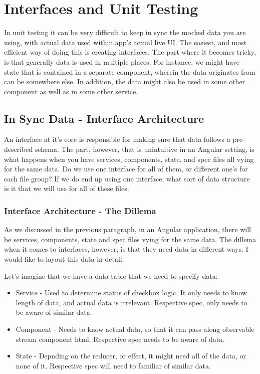 
\section{ Interfaces and Unit Testing }
In unit testing it can be very difficult to keep in sync the mocked data you
are using, with actual data used within app's actual live UI. The easiest, and
most efficient way of doing this is creating interfaces. The part where it
becomes tricky, is that generally data is used in multiple places. For instance,
we might have state that is contained in a separate component, wherein the data
originates from can be somewhere else. In addition, the data might also be used
in some other component as well as in some other service.

\subsection{ In Sync Data - Interface Architecture }
An interface at it's core is responsible for making sure that data follows a
pre-described schema. The part, however, that is unintuitive in an Angular
setting, is what happens when you have services, components, state, and spec
files all vying for the same data. Do we use one interface for all of them,
or different one's for each file group? If we do end up using one interface,
what sort of data structure is it that we will use for all of these files.

\subsubsection{ Interface Architecture - The Dillema }
As we discussed in the previous paragraph, in an Angular application, there will
be services, components, state and spec files vying for the same data. The
dillema when it comes to interfaces, however, is that they need data in
different ways. I would like to layout this data in detail.

Let's imagine that we have a data-table that we need to specify data:
\begin{itemize}
  \item Service - Used to determine status of checkbox logic. It only needs to
  know length of data, and actual data is irrelevant. Respective spec, only
  needs to be aware of similar data.
  \item Component - Needs to know actual data, so that it can pass along
  observable stream component html. Respective spec needs to be aware of data.
  \item State - Depnding on the reducer, or effect, it might need all of the
  data, or none of it. Respective spec will need to familiar of similar data.
\end{itemize}


